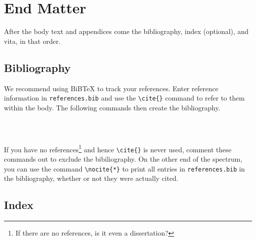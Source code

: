 \section{End Matter} %

After the body text and appendices come the bibliography, index (optional), and vita, in that order.

\subsection{Bibliography} %
\label{section:bibliography}

We recommend using BiB\TeX{} to track your references.
%
Enter reference information in \texttt{references.bib} and use the \verb+\cite{}+ command to refer to them within the body.
The following commands then create the bibliography.
\begin{verbatim}
    
    
\end{verbatim}
If you have no references\footnote{If there are no references, is it even a dissertation?} and hence \verb+\cite{}+ is never used, comment these commands out to exclude the bibiliography.
On the other end of the spectrum, you can use the command \verb+\nocite{*}+ to print all entries in \texttt{references.bib} in the bibliography, whether or not they were actually cited.

\subsection{Index} %
\label{sec:usage:index}


